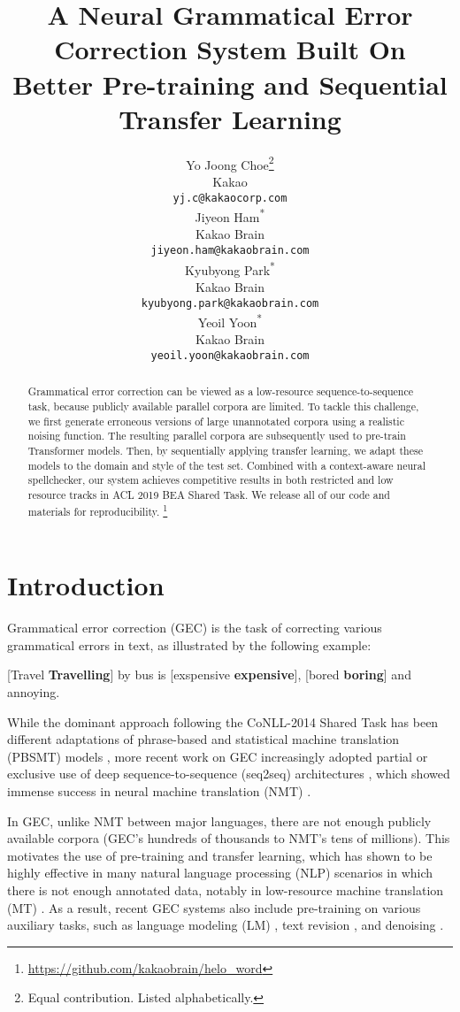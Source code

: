 \documentclass[11pt,a4paper]{article}
\title{
A Neural Grammatical Error Correction System Built On \\
Better Pre-training and Sequential Transfer Learning 
}
\author{
Yo Joong Choe\thanks{\;\;Equal contribution. Listed alphabetically.} \\
  Kakao \\
  \texttt{yj.c@kakaocorp.com} \\\And
  Jiyeon Ham\textsuperscript{*} \\
  Kakao Brain \\
  \texttt{jiyeon.ham@kakaobrain.com} \\\AND
  Kyubyong Park\textsuperscript{*} \\
  Kakao Brain \\
  \texttt{kyubyong.park@kakaobrain.com} \\\And
  Yeoil Yoon\textsuperscript{*} \\
  Kakao Brain \\
  \texttt{yeoil.yoon@kakaobrain.com} \\
}
\date{}
\begin{document}
\maketitle
\begin{abstract}
Grammatical error correction can be viewed as a low-resource sequence-to-sequence task, because publicly available parallel corpora are limited. 
To tackle this challenge, we first generate erroneous versions of large unannotated corpora using a realistic noising function.
The resulting parallel corpora are subsequently used to pre-train Transformer models.
Then, by sequentially applying transfer learning, we adapt these models to the domain and style of the test set. 
Combined with a context-aware neural spellchecker, our system achieves competitive results in both restricted and low resource tracks in ACL 2019 BEA Shared Task. 
We release all of our code and materials for reproducibility. \footnote{\url{https://github.com/kakaobrain/helo\_word}}
\end{abstract}

\section{Introduction}

Grammatical error correction (GEC) is the task of correcting various grammatical errors in text, as illustrated by the following example:
\begin{center}
    [Travel  \textbf{Travelling}] by bus is [exspensive  \textbf{expensive}], [bored  \textbf{boring}] and annoying.
\end{center}

While the dominant approach following the CoNLL-2014 Shared Task \cite{ng2014conll} has been different adaptations of phrase-based and statistical machine translation (PBSMT) models \cite{junczys2016phrase}, more recent work on GEC increasingly adopted partial \cite{grundkiewicz2018near} or exclusive \cite{junczys2018approaching, chollampatt2018multilayer} use of deep sequence-to-sequence (seq2seq) architectures \cite{sutskever2014sequence, cho2014learning}, which showed immense success in neural machine translation (NMT) \cite{bahdanau2015neural, gehring2017convolutional, vaswani2017attention}.

In GEC, unlike NMT between major languages, there are not enough publicly available corpora (GEC's hundreds of thousands to NMT's tens of millions). 
This motivates the use of pre-training and transfer learning, which has shown to be highly effective in many natural language processing (NLP) scenarios in which there is not enough annotated data, notably in low-resource machine translation (MT) \cite{lample2018phrase, ruder2019neural}.
As a result, recent GEC systems also include pre-training on various auxiliary tasks, such as language modeling (LM) \cite{junczys2018approaching}, text revision \cite{lichtarge2018weakly}, and denoising \cite{zhao2019improving}.
\end{document}
